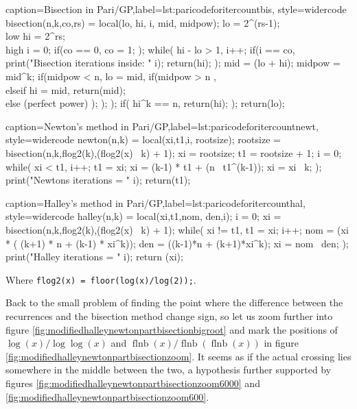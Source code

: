 \documentclass[a4paper,10pt]{report}
\theoremstyle{plain} %
\theoremstyle{definition}
\theoremstyle{remark}
\begin{document}
\lstset{language=parigp,style=code}
\begin{pblisting}{caption={Bisection in Pari/GP},label=lst:paricodeforitercountbis, style=widercode}
bisection(n,k,co,rs) = {
  local(lo, hi, i, mid, midpow);
  lo = 2^(rs-1); \\ low
  hi = 2^rs;     \\ high
  i = 0;
  if(co == 0,
     co = 1;
  );
  while(
    hi - lo > 1,
    i++;
    if(i == co,
       print("Bisection iterations inside: " i);
       return(hi);
    );
    mid = (lo + hi)\2;
    midpow = mid^k;
    if(midpow < n,
       lo = mid,
       if(midpow > n , \\elseif
          hi = mid,
          return(mid); \\ else (perfect power)
       );
    );  
  );
  if( hi^k == n,
    return(hi);
  );
  return(lo);
}
\end{pblisting}
\begin{pblisting}{caption={Newton's method in Pari/GP},label=lst:paricodeforitercountnewt, style=widercode}
newton(n,k) = {
   local(xi,t1,i, rootsize);
   rootsize = bisection(n,k,flog2(k),(flog2(x) \ k) + 1);
   xi = rootsize;
   t1 = rootsize + 1;
   i = 0;
   while(
      xi < t1,
      i++;
      t1 = xi;
      xi = (k-1) * t1 + (n \ t1^(k-1));
      xi = xi \ k;
   );
   print("Newtons iterations = " i);
   return(t1);
}
\end{pblisting}
\begin{pblisting}{caption={Halley's method in Pari/GP},label=lst:paricodeforitercounthal, style=widercode}
halley(n,k) = {
   local(xi,t1,nom, den,i);
   i = 0;
   xi = bisection(n,k,flog2(k),(flog2(x) \ k) + 1);
   while(
      xi != t1,
      t1 = xi;
      i++;
      nom = (xi * ( (k+1) * n + (k-1) * xi^k));
      den = ((k-1)*n + (k+1)*xi^k);
      xi = nom \ den;
   );
   print("Halley iterations = " i);
   return (xi);
}
\end{pblisting}
Where \lstinline!flog2(x) = floor(log(x)/log(2));!.

Back to the small problem of finding the point where the difference between the recurrences and the bisection method change sign, so let us zoom further into figure \ref{fig:modifiedhalleynewtonpartbisectionbigroot} and mark the positions of $\log(x)/\log \log(x)$ and $\operatorname{flnb}(x) / \operatorname{flnb}(\operatorname{flnb}(x))$ in figure \ref{fig:modifiedhalleynewtonpartbisectionzoom}. It seems as if the actual crossing lies somewhere in the middle between the two, a hypothesis further supported by figures \ref{fig:modifiedhalleynewtonpartbisectionzoom6000} and \ref{fig:modifiedhalleynewtonpartbisectionzoom600}.
\end{document}
